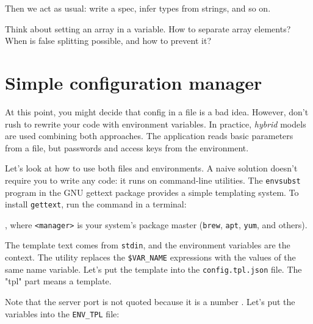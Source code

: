 \fi

\noindent
Then we act as usual: write a spec, infer types from strings, and so on.

Think about setting an array in a variable. How to separate array elements? When is false splitting possible, and how to prevent it?

\section{Simple configuration manager}


At this point, you might decide that config in a file is a bad idea. However, don't rush to rewrite your code with environment variables. In practice, \emph{hybrid} models are used combining both approaches. The application reads basic parameters from a file, but passwords and access keys from the environment.


Let's look at how to use both files and environments. A naive solution doesn't require you to write any code: it runs on command-line utilities. The \verb|envsubst| program in the GNU gettext package provides a simple templating system. To install \verb|gettext|, run the command in a terminal:



\noindent
, where \verb|<manager>| is your system's package master (\verb|brew|, \verb|apt|, \verb|yum|, and others).


The template text comes from \verb|stdin|, and the environment variables are the context. The utility replaces the \verb|$VAR_NAME| expressions with the values of the same name variable. Let's put the template into the \verb|config.tpl.json| file. The "tpl" part means a template.


\noindent
Note that the server port is not quoted because it is a number . Let's put the variables into the \verb|ENV_TPL| file:

